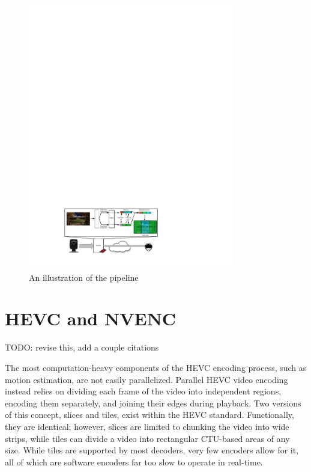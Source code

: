 \renewcommand{\figurename}{Fig.}
\begin{figure}[t]
	\centering
	\includegraphics[width=0.8\textwidth]{figures/Streaming_scenario_v2.pdf}
	\caption{An illustration of the pipeline}
\end{figure}

\section{HEVC and NVENC}

TODO: revise this, add a couple citations

The most computation-heavy components of the HEVC encoding process, such as motion estimation, are not easily parallelized. Parallel HEVC video encoding instead relies on dividing each frame of the video into independent regions, encoding them separately, and joining their edges during playback. Two versions of this concept, slices and tiles, exist within the HEVC standard. Functionally, they are identical; however, slices are limited to chunking the video into wide strips, while tiles can divide a video into rectangular CTU-based areas of any size. While tiles are supported by most decoders, very few encoders allow for it, all of which are software encoders far too slow to operate in real-time.

